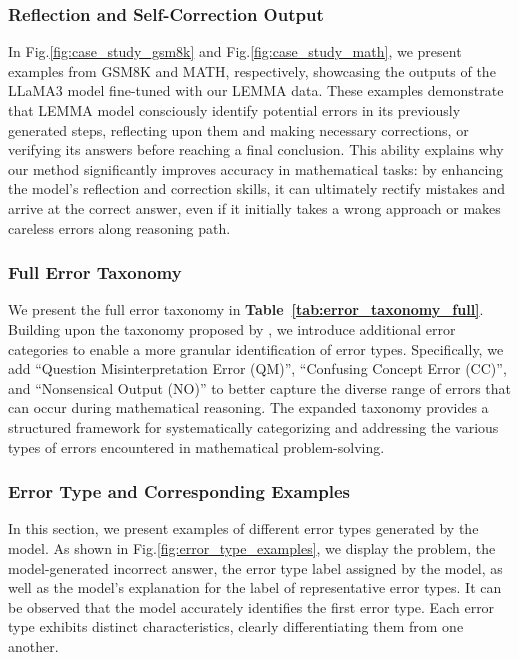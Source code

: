 \subsubsection{Reflection and Self-Correction Output}


In Fig.\ref{fig:case_study_gsm8k} and Fig.\ref{fig:case_study_math}, we present examples from GSM8K and MATH, respectively, showcasing the outputs of the LLaMA3 model fine-tuned with our LEMMA data. These examples demonstrate that LEMMA model consciously identify potential errors in its previously generated steps, reflecting upon them and making necessary corrections, or verifying its answers before reaching a final conclusion. This ability explains why our method significantly improves accuracy in mathematical tasks: by enhancing the model's reflection and correction skills, it can ultimately rectify mistakes and arrive at the correct answer, even if it initially takes a wrong approach or makes careless errors along reasoning path.

\subsubsection{Full Error Taxonomy}
We present the full error taxonomy in \textbf{Table~\ref{tab:error_taxonomy_full}}. Building upon the taxonomy proposed by \citet{li-etal-2024-evaluating-mathematical}, we introduce additional error categories to enable a more granular identification of error types. Specifically, we add ``Question Misinterpretation Error (QM)'', ``Confusing Concept Error (CC)'', and ``Nonsensical Output (NO)'' to better capture the diverse range of errors that can occur during mathematical reasoning. The expanded taxonomy provides a structured framework for systematically categorizing and addressing the various types of errors encountered in mathematical problem-solving.


\subsubsection{Error Type and Corresponding Examples}

In this section, we present examples of different error types generated by the model. As shown in Fig.\ref{fig:error_type_examples}, we display the problem, the model-generated incorrect answer, the error type label assigned by the model, as well as the model's explanation for the label of representative error types. It can be observed that the model accurately identifies the first error type. Each error type exhibits distinct characteristics, clearly differentiating them from one another.

